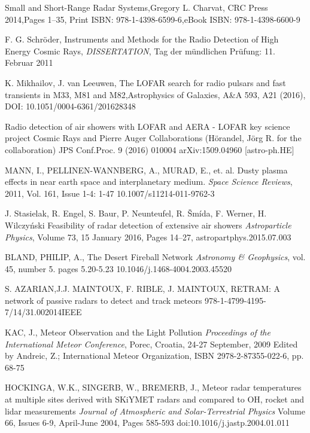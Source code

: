 \documentclass[twoside]{ctuthesis}
\theoremstyle{plain}
\theoremstyle{definition}
\theoremstyle{note}
\begin{document}
\begin{thebibliography}{99}




Small and Short-Range Radar Systems,Gregory L. Charvat, CRC Press 2014,Pages 1–35, Print ISBN: 978-1-4398-6599-6,eBook ISBN: 978-1-4398-6600-9

F. G. Schröder, Instruments and Methods for the Radio Detection of High Energy Cosmic Rays,
\emph{DISSERTATION}, Tag der mündlichen Prüfung: 11. Februar 2011

K. Mikhailov, J. van Leeuwen, The LOFAR search for radio pulsars and fast transients in M33, M81 and M82,Astrophysics of Galaxies, A\&A 593, A21 (2016), DOI: 10.1051/0004-6361/201628348

Radio detection of air showers with LOFAR and AERA - LOFAR key science project Cosmic Rays and Pierre Auger Collaborations (Hörandel, Jörg R. for the collaboration) JPS Conf.Proc. 9 (2016) 010004 arXiv:1509.04960 [astro-ph.HE]

MANN, I., PELLINEN-WANNBERG, A., MURAD, E., et. al.
Dusty plasma effects in near earth space and interplanetary medium.
\emph{Space Science Reviews}, 2011, Vol. 161, Issue 1-4: 1-47 
10.1007/s11214-011-9762-3 

J. Stasielak, R. Engel, S. Baur, P. Neunteufel, R. Šmída, F. Werner, H. Wilczyński
Feasibility of radar detection of extensive air showers
\emph{Astroparticle Physics}, Volume 73, 15 January 2016, Pages 14–27, astropartphys.2015.07.003 


BLAND, PHILIP, A.,
The Desert Fireball Network
\emph{Astronomy \& Geophysics}, vol. 45, number 5. pages 5.20-5.23
10.1046/j.1468-4004.2003.45520

S. AZARIAN,J.J. MAINTOUX, F. RIBLE, J. MAINTOUX,
RETRAM: A network of passive radars to detect and 
track meteors
978-1-4799-4195-7/14/31.002014IEEE


KAC, J.,
Meteor Observation and the Light Pollution
\emph{Proceedings of the International Meteor Conference}, Porec, Croatia, 24-27 September, 2009 Edited by Andreic, Z.;  International Meteor Organization, ISBN 2978-2-87355-022-6, pp. 68-75

HOCKINGA, W.K., SINGERB, W., BREMERB, J.,
Meteor radar temperatures at multiple sites derived with SKiYMET radars and compared to OH, rocket and lidar measurements
\emph{Journal of Atmospheric and Solar-Terrestrial Physics}
Volume 66, Issues 6-9, April-June 2004, Pages 585-593
doi:10.1016/j.jastp.2004.01.011


\end{thebibliography}
\end{document}
